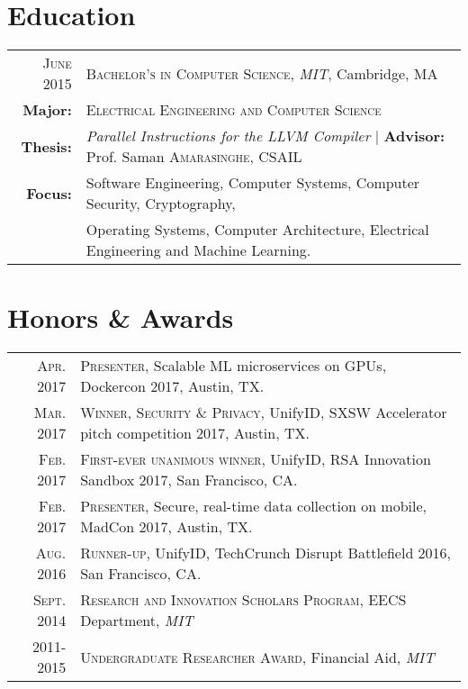 \documentclass[lettersize,10pt]{article}
\begin{document}
\section{Education}
\begin{tabular}{rl}
\textsc{June} 2015 & \textsc{Bachelor's in Computer Science}, \emph{MIT}, Cambridge, MA\\
\textbf{Major:} & \textsc{Electrical Engineering and Computer Science}\\
\textbf{Thesis:} & \emph{Parallel Instructions for the LLVM Compiler} | \textbf{Advisor:} Prof. Saman \textsc{Amarasinghe}, CSAIL\\
\textbf{Focus:} &  Software Engineering, Computer Systems, Computer Security, Cryptography, \\
& Operating Systems, Computer Architecture, Electrical Engineering and Machine Learning.\\
\end{tabular}

\section{Honors \& Awards}
\begin{tabular}{rl}
 \textsc{Apr.} 2017 & \textsc{Presenter}, Scalable ML microservices on GPUs, Dockercon 2017, Austin, TX. \\
 \textsc{Mar.} 2017 & \textsc{Winner, Security \& Privacy}, UnifyID, SXSW Accelerator pitch competition 2017, Austin, TX. \\
 \textsc{Feb.} 2017 & \textsc{First-ever unanimous winner}, UnifyID, RSA Innovation Sandbox 2017, San Francisco, CA. \\
 \textsc{Feb.} 2017 & \textsc{Presenter}, Secure, real-time data collection on mobile, MadCon 2017, Austin, TX. \\
 \textsc{Aug.} 2016 & \textsc{Runner-up}, UnifyID, TechCrunch Disrupt Battlefield 2016, San Francisco, CA. \\
 \textsc{Sept.} 2014 & \textsc{Research and Innovation Scholars Program}, EECS Department, \emph{MIT}\\
2011-2015 & \textsc{Undergraduate Researcher Award}, Financial Aid, \emph{MIT}\\
\end{tabular}
\end{document}
